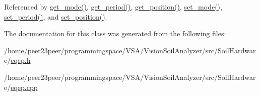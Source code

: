 Referenced by \hyperlink{eqep_8cpp_source_l00219}{get\+\_\+mode()}, \hyperlink{eqep_8cpp_source_l00195}{get\+\_\+period()}, \hyperlink{eqep_8cpp_source_l00137}{get\+\_\+position()}, \hyperlink{eqep_8cpp_source_l00105}{set\+\_\+mode()}, \hyperlink{eqep_8cpp_source_l00085}{set\+\_\+period()}, and \hyperlink{eqep_8cpp_source_l00065}{set\+\_\+position()}.



The documentation for this class was generated from the following files\+:\begin{DoxyCompactItemize}
\item 
/home/peer23peer/programmingspace/\+V\+S\+A/\+Vision\+Soil\+Analyzer/src/\+Soil\+Hardware/\hyperlink{eqep_8h}{eqep.\+h}\item 
/home/peer23peer/programmingspace/\+V\+S\+A/\+Vision\+Soil\+Analyzer/src/\+Soil\+Hardware/\hyperlink{eqep_8cpp}{eqep.\+cpp}\end{DoxyCompactItemize}
